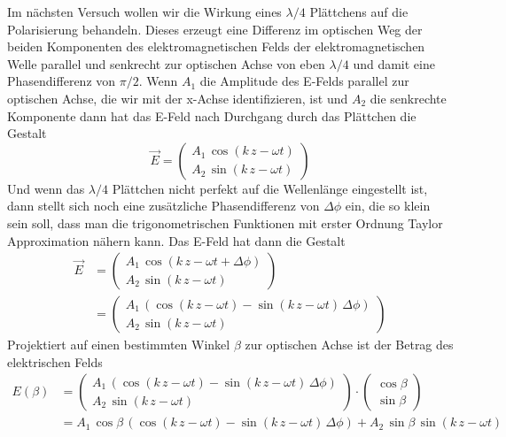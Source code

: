 \documentclass[a4paper, 12pt,]{scrartcl}
\begin{document}
Im nächsten Versuch wollen wir die Wirkung eines $\lambda/4$ Plättchens auf die Polarisierung behandeln. Dieses erzeugt eine Differenz im optischen Weg der beiden Komponenten des elektromagnetischen Felds der elektromagnetischen Welle parallel und senkrecht zur optischen Achse von eben $\lambda/4$ und damit eine Phasendifferenz von $\pi/2$. Wenn $A_1$ die Amplitude des E-Felds parallel zur optischen Achse, die wir mit der x-Achse identifizieren, ist und $A_2$ die senkrechte Komponente dann hat das E-Feld nach Durchgang durch das Plättchen die Gestalt
\begin{equation*}\vec{E}=\left(\begin{array}{c}A_1\,\cos(k\,z-\omega{t})\\A_2\,\sin(k\,z-\omega{t})\end{array}\right)\end{equation*}
Und wenn das $\lambda/4$ Plättchen nicht perfekt auf die Wellenlänge eingestellt ist, dann stellt sich noch eine zusätzliche Phasendifferenz  von $\Delta\phi$ ein, die so klein sein soll, dass man die trigonometrischen Funktionen mit erster Ordnung Taylor Approximation nähern kann. Das E-Feld hat dann die Gestalt
\begin{align*}\vec{E}&=\left(\begin{array}{c}A_1\,\cos(k\,z-\omega{t}+\Delta\phi)\\A_2\,\sin(k\,z-\omega{t})\end{array}\right)\\
&=\left(\begin{array}{c}A_1\,\left(\cos(k\,z-\omega{t})-\sin(k\,z-\omega{t})\,\Delta\phi\right)\\A_2\,\sin(k\,z-\omega{t})\end{array}\right)
\end{align*}
Projektiert auf einen bestimmten Winkel $\beta$ zur optischen Achse ist der Betrag des elektrischen Felds
\begin{align*}E(\beta)&=\left(\begin{array}{c}A_1\,\left(\cos(k\,z-\omega{t})-\sin(k\,z-\omega{t})\,\Delta\phi\right)\\A_2\,\sin(k\,z-\omega{t})\end{array}\right)\cdot\left(\begin{array}{c}\cos\beta\\\sin\beta\end{array}\right)\\
&=A_1\,\cos\beta\,\left(\cos(k\,z-\omega{t})-\sin(k\,z-\omega{t})\,\Delta\phi\right)+A_2\,\sin\beta\,\sin(k\,z-\omega{t})
\end{align*}
\end{document}
